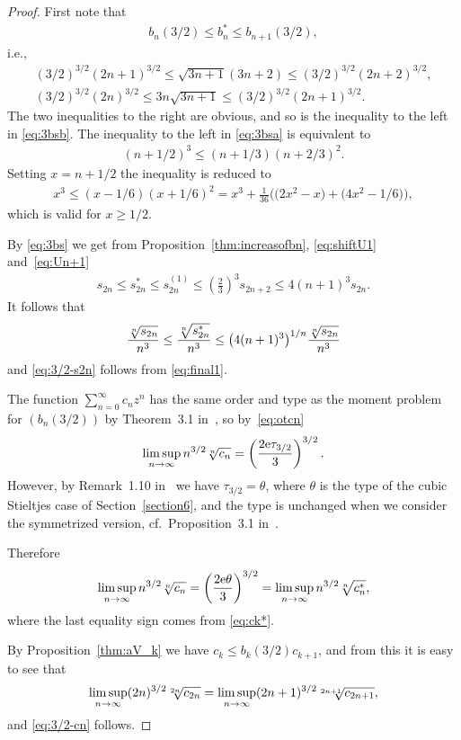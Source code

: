 \documentclass[pdftex]{sigma}
\numberwithin{equation}{section}
\begin{document}
\begin{proof} First note that
\begin{gather}\label{eq:3bs}
b_n(3/2)\le b_n^* \le b_{n+1}(3/2),
\end{gather}
i.e.,
\begin{gather}\label{eq:3bsa}
(3/2)^{3/2}(2n+1)^{3/2} \le \sqrt{3n+1}(3n+2) \le (3/2)^{3/2}(2n+2)^{3/2},\\
(3/2)^{3/2}(2n)^{3/2} \le 3n\sqrt{3n+1} \le (3/2)^{3/2}(2n+1)^{3/2}\label{eq:3bsb}.
\end{gather}
The two inequalities to the right are obvious, and so is the inequality to the left in \eqref{eq:3bsb}. The inequality to the left in \eqref{eq:3bsa} is equivalent to
\begin{gather*}
(n+1/2)^3 \le (n+1/3)(n+2/3)^2.
\end{gather*}
Setting $x=n+1/2$ the inequality is reduced to
\begin{gather*}
x^3\le (x-1/6)(x+1/6)^2= x^3+ \frac{1}{36}\big(\big(2x^2-x\big)+\big(4x^2-1/6\big)\big),
\end{gather*}
which is valid for $x\ge 1/2$.

By \eqref{eq:3bs} we get from Proposition~\ref{thm:increasofbn}, \eqref{eq:shiftU1} and~\eqref{eq:Un+1}
\begin{gather*}
s_{2n}\le s_{2n}^* \le s_{2n}^{(1)} \le \left(\frac23\right)^3 s_{2n+2}\le 4(n+1)^3 s_{2n}.
\end{gather*}
It follows that
\begin{gather*}
\frac{\root{n}\of{s_{2n}}}{n^3} \le \frac{\root{n}\of{s_{2n}^*}}{n^3} \le \big(4(n+1)^3\big)^{1/n}\frac{\root{n}\of{s_{2n}}}{n^3}
\end{gather*}
and \eqref{eq:3/2-s2n} follows from \eqref{eq:final1}.

The function $\sum\limits_{n=0}^\infty c_nz^n$ has the same order and type as the moment problem for $(b_n(3/2))$ by Theorem~3.1 in~\cite{B:S2}, so by~\eqref{eq:otcn}
\begin{gather*}
\limsup_{n\to\infty} n^{3/2} \root{n}\of{c_n} = \left(\frac{2 {\rm e}\tau_{3/2}} {3}\right)^{3/2}.
\end{gather*}
 However, by Remark~1.10 in~\cite{B:S3} we have $\tau_{3/2}=\theta$, where $\theta$ is the type of the cubic Stieltjes case of Section~\ref{section6}, and the type is unchanged when we consider the symmetrized version, cf.\ Proposition~3.1 in~\cite{B:S3}.

Therefore
\begin{gather*}
\limsup_{n\to\infty} n^{3/2}\root{n}\of{c_n} = \left(\frac{2{\rm e}\theta}{3}\right)^{3/2}= \limsup_{n\to\infty} n^{3/2}\root{n}\of{c_n^*},
\end{gather*}
where the last equality sign comes from \eqref{eq:ck*}.

By Proposition~\ref{thm:aV_k} we have $c_k\le b_k(3/2)c_{k+1}$, and from this it is easy to see that
\begin{gather*}
\limsup_{n\to\infty}(2n)^{3/2}\root{2n}\of{c_{2n}} = \limsup_{n\to\infty}(2n+1)^{3/2}\root{2n+1}\of{c_{2n+1}},
\end{gather*}
and \eqref{eq:3/2-cn} follows.
\end{proof}
\end{document}
